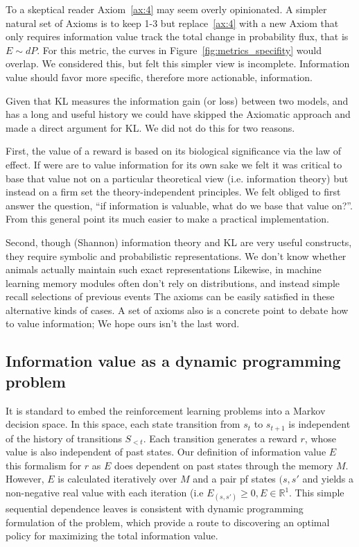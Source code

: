 \documentclass[9pt,twocolumn,twoside]{pnas-new}
\begin{document}
To a skeptical reader Axiom~\ref{ax:4} may seem overly opinionated. A simpler natural set of Axioms is to keep 1-3 but replace~\ref{ax:4} with a new Axiom  that only requires information value track the total change in probability flux, that is $E \sim dP$. For this metric, the curves in Figure~\ref{fig:metrics_specifity} would overlap. We considered this, but felt this simpler view is incomplete. Information value should favor more specific, therefore more actionable, information. 

Given that KL measures the information gain (or loss) between two models, and has a long and useful history %
we could have skipped the Axiomatic approach and made a direct argument for KL. We did not do this for two reasons. 

First, the value of a reward is based on its biological significance via the law of effect. If were are to value information for its own sake we felt it was critical to base that value not on a particular theoretical view (i.e. information theory) but instead on a firm set the theory-independent principles. We felt obliged to first answer the question, ``if information is valuable, what do we base that value on?''. From this general point its much easier to make a practical implementation. 

Second, though (Shannon) information theory and KL are very useful constructs, they require symbolic and probabilistic representations. We don't know whether animals actually maintain such exact representations %
Likewise, in machine learning memory modules often don't rely on distributions, and instead simple recall selections of previous events %
The axioms can be easily satisfied in these alternative kinds of cases. A set of axioms also is a concrete point to debate how to value information; We hope ours isn't the last word.


\subsection*{Information value as a dynamic programming problem}
It is standard to embed the reinforcement learning problems into a Markov decision space. In this space, each state transition from $s_t$ to $s_{t+1}$ is independent of the history of transitions $S_{<t}$. Each transition generates a reward $r$, whose value is also independent of past states. Our definition of information value $E$ this formalism for $r$ as $E$ does dependent on past states through the memory $M$. However, $E$ is calculated iteratively over $M$ and a pair pf states $(s, s'$ and yields a non-negative real value with each iteration (i.e $E_{(s,s')} \ge 0, E \in \mathbb{R}^1$.  This simple sequential dependence leaves is consistent with dynamic programming formulation of the problem, which provide a route to discovering an optimal policy for maximizing the total information value. 
\end{document}
